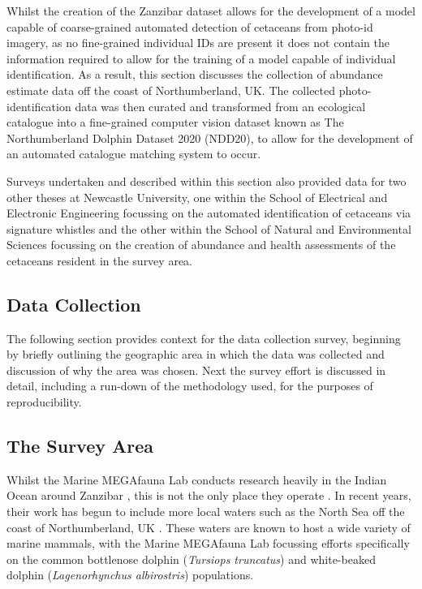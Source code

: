 Whilst the creation of the Zanzibar dataset allows for the development of a model capable of coarse-grained automated detection of cetaceans from photo-id imagery, as no fine-grained individual IDs are present it does not contain the information required to allow for the training of a model capable of individual identification. As a result, this section discusses the collection of abundance estimate data off the coast of Northumberland, UK. The collected photo-identification data was then curated and transformed from an ecological catalogue into a fine-grained computer vision dataset known as The Northumberland Dolphin Dataset 2020 (NDD20), to allow for the development of an automated catalogue matching system to occur. 

Surveys undertaken and described within this section also provided data for two other theses at Newcastle University, one within the School of Electrical and Electronic Engineering focussing on the automated identification of cetaceans via signature whistles and the other within the School of Natural and Environmental Sciences focussing on the creation of abundance and health assessments of the cetaceans resident in the survey area.

\subsection{Data Collection}\label{ch:datasetCreation,sec:NDD,sub:dataCollection}

The following section provides context for the data collection survey, beginning by briefly outlining the geographic area in which the data was collected and discussion of why the area was chosen. Next the survey effort is discussed in detail, including a run-down of the methodology used, for the purposes of reproducibility. 

\subsection{The Survey Area}\label{ch:datasetCreation,sec:NDD,sub:surveyArea}

Whilst the Marine MEGAfauna Lab conducts research heavily in the Indian Ocean around Zanzibar \cite{yang_description_2020, temple_life-history_2020, temple_marine_2019, temple_marine_2018, weigmann_revision_2020, barrowclift_social_2017}, this is not the only place they operate \cite{temple_by-catch_2021, yang_classification_2017, yang_influence_2022}. In recent years, their work has begun to include more local waters such as the North Sea off the coast of Northumberland, UK \cite{van_bressem_visual_2018, yang_characterization_2021}. These waters are known to host a wide variety of marine mammals, with the Marine MEGAfauna Lab focussing efforts specifically on the common bottlenose dolphin (\textit{Tursiops truncatus}) and white-beaked dolphin (\textit{Lagenorhynchus albirostris}) populations. 

